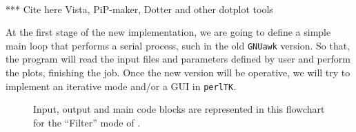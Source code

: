 \documentclass[11pt]{article}
\let\nwdocspar=\par                    %
\begin{document}

\newpage

\thispagestyle{empty}

\ %

\newpage
{}
\setcounter{page}{1}
\pagestyle{fancy}
\renewcommand{\sectionmark}[1]{\markboth{}{\textbf{\prog}\hspace{4ex}\thesection.\ #1}} 
\renewcommand{\subsectionmark}[1]{\markboth{}{\textbf{\prog}\hspace{4ex}\thesubsection.\ \textsl{#1}}}

\tableofcontents

\clearpage

\listoftables

\listoffigures


\newpage
{}
\setcounter{page}{1}


*** Cite here Vista, PiP-maker, Dotter and other dotplot tools

\nwenddocs{}%
\nwdocspar


At the first stage of the new {\prog} implementation, we are going to define a simple main loop that performs a serial process, such in the old {\tt{}GNUawk} version. So that, the program will read the input files and parameters defined by user and perform the plots, finishing the job. Once the new version will be operative, we will try to implement an iterative mode and/or a GUI in {\tt{}perlTK}.  

\label{todo:AAA}
\nwenddocs{}%
%
\nwdocspar
\nwenddocs{}%
%
\nwdocspar
\todo{ \item \todoAAA } %
\begin{figure}[!ht]
\begin{center}
\fbox{\parbox[c][8cm][c]{\linewidth}{\hfill}}
\caption[``Filter'' mode of {\prog}.]{\label{fig:filtermode} Input, output and main code blocks are represented in this flowchart for the ``Filter'' mode of {\prog}.}
\end{center}
\end{figure}

\end{document}
